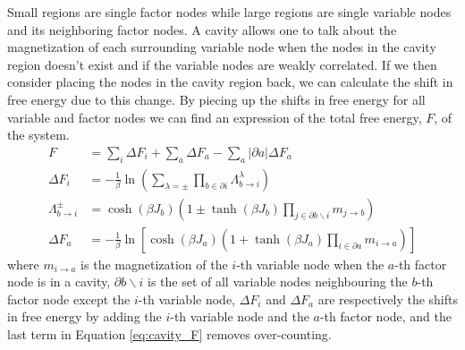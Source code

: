 \documentclass[%
 reprint,
 amsmath,amssymb,
 aps,
]{revtex4-2}
\begin{document}
Small regions are single factor nodes while large regions are single variable nodes and its neighboring factor nodes.
A cavity allows one to talk about the magnetization of each surrounding variable node when the nodes in the cavity region doesn't exist and if the variable nodes are weakly correlated. If we then consider placing the nodes in the cavity region back, we can calculate the shift in free energy due to this change. By piecing up the shifts in free energy for all variable and factor nodes \cite{huang2021statistical_cavity_F} we can find an expression of the total free energy, $F$, of the system. 
\begin{align}
F&=\sum_i \Delta F_i + \sum_a \Delta F_a- \sum_a |\partial a| \Delta F_a
    \label{eq:cavity_F}\\
\Delta F_i &= -\frac{1}{\beta} \ln{\left( \sum_{\lambda = \pm} \prod_{b\in \partial i} \Lambda^{\lambda}_{b \rightarrow i} \right)}
    \label{eq:cavity_F_var_contri} \\
\Lambda^{\pm}_{b\rightarrow i}&=\cosh{(\beta J_b)}\left( 1 \pm \tanh{(\beta J_b)} \prod_{j\in \partial b \backslash i} m_{j\rightarrow b}   \right)
    \label{eq:Lambda_pm}\\
\Delta F_a &= -\frac{1}{\beta} \ln{\left[\cosh{(\beta J_a)}\left( 1+\tanh{(\beta J_a)} \prod_{i\in \partial a} m_{i\rightarrow a} \right) \right]}
    \label{eq:cavity_F_fac_contri}
\end{align}
where $m_{i\rightarrow a}$ is the magnetization of the $i$-th variable node when the $a$-th factor node is in a cavity, $\partial b \backslash i$ is the set of all variable nodes neighbouring the $b$-th factor node except the $i$-th variable node, $\Delta F_i$ and $\Delta F_a$ are respectively the shifts in free energy by adding the $i$-th variable node and the $a$-th factor node, and the last term in Equation \ref{eq:cavity_F} removes over-counting. 
\end{document}
